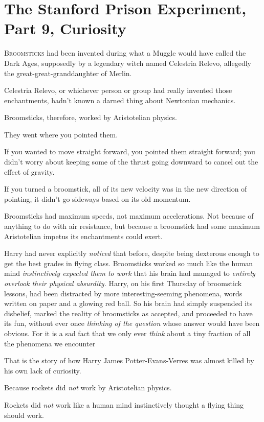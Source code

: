 \chapter{The Stanford Prison Experiment, Part 9, Curiosity}

\lettrine{B}{roomsticks} had
been invented during what a Muggle would have called the Dark Ages, supposedly
by a legendary witch named Celestria Relevo, allegedly the
great-great-granddaughter of Merlin.

Celestria Relevo, or whichever person or group had really invented those
enchantments, hadn't known a darned thing about Newtonian mechanics.

Broomsticks, therefore, worked by Aristotelian physics.

They went where you pointed them.

If you wanted to move straight forward, you pointed them straight forward; you
didn't worry about keeping some of the thrust going downward to cancel out the
effect of gravity.

If you turned a broomstick, all of its new velocity was in the new direction of
pointing, it didn't go sideways based on its old momentum.

Broomsticks had maximum speeds, not maximum accelerations. Not because of
anything to do with air resistance, but because a broomstick had some maximum
Aristotelian impetus its enchantments could exert.

Harry had never explicitly \emph{noticed} that before, despite being dexterous
enough to get the best grades in flying class. Broomsticks worked so much like
the human mind \emph{instinctively expected them to work} that his brain had
managed to \emph{entirely overlook their physical absurdity.} Harry, on his
first Thursday of broomstick lessons, had been distracted by more
interesting-seeming phenomena, words written on paper and a glowing red ball.
So his brain had simply suspended its disbelief, marked the reality of
broomsticks as accepted, and proceeded to have its fun, without ever once
\emph{thinking of the question} whose answer would have been obvious. For it is
a sad fact that we only ever \emph{think} about a tiny fraction of all the
phenomena we encounter{\el}

That is the story of how Harry James Potter-Evans-Verres was almost killed by
his own lack of curiosity.

Because rockets did \emph{not} work by Aristotelian physics.

Rockets did \emph{not} work like a human mind instinctively thought a flying
thing should work.

